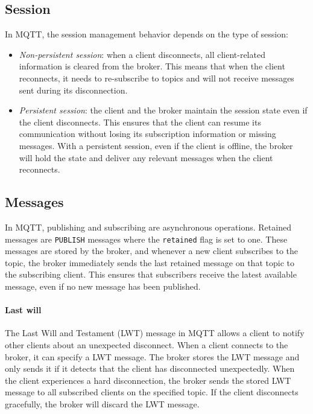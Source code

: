 \subsection{Session}
In MQTT, the session management behavior depends on the type of session: 
\begin{itemize}
    \item \textit{Non-persistent session}: when a client disconnects, all client-related information is cleared from the broker. 
        This means that when the client reconnects, it needs to re-subscribe to topics and will not receive messages sent during its disconnection.
    \item \textit{Persistent session}: the client and the broker maintain the session state even if the client disconnects. 
        This ensures that the client can resume its communication without losing its subscription information or missing messages. 
        With a persistent session, even if the client is offline, the broker will hold the state and deliver any relevant messages when the client reconnects. 
\end{itemize}

\subsection{Messages}
In MQTT, publishing and subscribing are asynchronous operations. 
Retained messages are \texttt{PUBLISH} messages where the \texttt{retained} flag is set to one. 
These messages are stored by the broker, and whenever a new client subscribes to the topic, the broker immediately sends the last retained message on that topic to the subscribing client. 
This ensures that subscribers receive the latest available message, even if no new message has been published.

\paragraph*{Last will}
The Last Will and Testament (LWT) message in MQTT allows a client to notify other clients about an unexpected disconnect. 
When a client connects to the broker, it can specify a LWT message.
The broker stores the LWT message and only sends it if it detects that the client has disconnected unexpectedly.
When the client experiences a hard disconnection, the broker sends the stored LWT message to all subscribed clients on the specified topic.
If the client disconnects gracefully, the broker will discard the LWT message.

